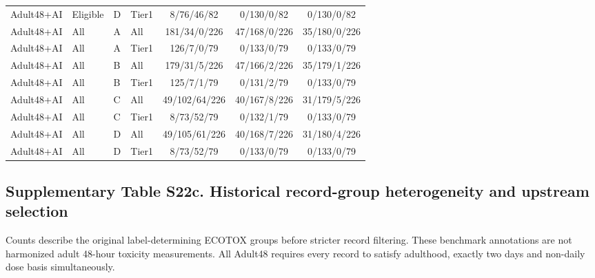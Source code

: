 \begin{longtable}{llllccc}
Adult48+AI & Eligible & D & Tier1 & 8/76/46/82 & 0/130/0/82 & 0/130/0/82 \\

Adult48+AI & All & A & All & 181/34/0/226 & 47/168/0/226 & 35/180/0/226 \\

Adult48+AI & All & A & Tier1 & 126/7/0/79 & 0/133/0/79 & 0/133/0/79 \\

Adult48+AI & All & B & All & 179/31/5/226 & 47/166/2/226 & 35/179/1/226 \\

Adult48+AI & All & B & Tier1 & 125/7/1/79 & 0/131/2/79 & 0/133/0/79 \\

Adult48+AI & All & C & All & 49/102/64/226 & 40/167/8/226 & 31/179/5/226 \\

Adult48+AI & All & C & Tier1 & 8/73/52/79 & 0/132/1/79 & 0/133/0/79 \\

Adult48+AI & All & D & All & 49/105/61/226 & 40/168/7/226 & 31/180/4/226 \\

Adult48+AI & All & D & Tier1 & 8/73/52/79 & 0/133/0/79 & 0/133/0/79 \\

\end{longtable}\endgroup

\subsection*{Supplementary Table S22c. Historical record-group heterogeneity and upstream selection}

Counts describe the original label-determining ECOTOX groups before stricter record filtering. These benchmark annotations are not harmonized adult 48-hour toxicity measurements. All Adult48 requires every record to satisfy adulthood, exactly two days and non-daily dose basis simultaneously.

\begingroup\footnotesize\setlength{\tabcolsep}{4pt}

